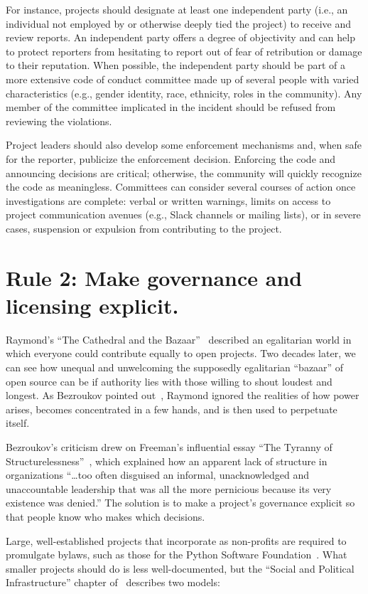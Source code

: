 \documentclass[10pt,letterpaper]{article}
\newcommand{\rulemajor}[1]{\section*{#1}}
\begin{document}
For instance,
projects should designate at least one independent party
(i.e., an individual not employed by or otherwise deeply tied the project)
to receive and review reports.
An independent party offers a degree of objectivity
and can help to protect reporters from hesitating to report out of fear of retribution or damage to their reputation.
When possible,
the independent party should be part of a more extensive code of conduct committee made up of several people with varied characteristics
(e.g., gender identity, race, ethnicity, roles in the community).
Any member of the committee implicated in the incident should be refused from reviewing the violations.

Project leaders should also develop some enforcement mechanisms and,
when safe for the reporter,
publicize the enforcement decision.
Enforcing the code and announcing decisions are critical;
otherwise,
the community will quickly recognize the code as meaningless.
Committees can consider several courses of action once investigations are complete:
verbal or written warnings,
limits on access to project communication avenues (e.g., Slack channels or mailing lists),
or in severe cases,
suspension or expulsion from contributing to the project.

\rulemajor{Rule 2: Make governance and licensing explicit.}

Raymond's ``The Cathedral and the Bazaar''~\cite{raymond2001}
described an egalitarian world in which everyone could contribute equally to open projects.
Two decades later,
we can see how unequal and unwelcoming the supposedly egalitarian ``bazaar'' of open source can be
if authority lies with those willing to shout loudest and longest.
As Bezroukov pointed out~\cite{bezroukov1999},
Raymond ignored the realities of how power arises,
becomes concentrated in a few hands,
and is then used to perpetuate itself.

Bezroukov's criticism drew on Freeman's influential essay ``The Tyranny of Structurelessness''~\cite{freeman1972},
which explained how an apparent lack of structure in organizations ``{\ldots}too often disguised an informal,
unacknowledged and unaccountable leadership that was all the more pernicious because its very existence was denied.''
The solution is to make a project's governance explicit
so that people know who makes which decisions.

Large, well-established projects that incorporate as non-profits are required to promulgate bylaws,
such as those for the Python Software Foundation~\cite{psf-bylaws}.
What smaller projects should do is less well-documented,
but the ``Social and Political Infrastructure'' chapter of~\cite{fogel2005}
describes two models:
\end{document}
